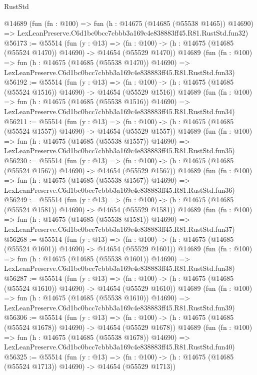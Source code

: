 \begin{lexlean}{RustStd}
\begin{coremodule}
    @14689
    (fun (fn : @100) =>
    fun (h : @14675 (@14685 (@55538 @1465)) @14690) =>
    LexLeanPreserve.C6d1bc0bcc7cbbb3a169c4e838883ff45.R81.RustStd.fun32)
@56173 := @55514
    (fun (y : @13) =>
    (fn : @100) -> (h : @14675 (@14685 (@55524 @1470)) @14690) -> @14654 (@55529 @1470))
    @14689
    (fun (fn : @100) =>
    fun (h : @14675 (@14685 (@55538 @1470)) @14690) =>
    LexLeanPreserve.C6d1bc0bcc7cbbb3a169c4e838883ff45.R81.RustStd.fun33)
@56192 := @55514
    (fun (y : @13) =>
    (fn : @100) -> (h : @14675 (@14685 (@55524 @1516)) @14690) -> @14654 (@55529 @1516))
    @14689
    (fun (fn : @100) =>
    fun (h : @14675 (@14685 (@55538 @1516)) @14690) =>
    LexLeanPreserve.C6d1bc0bcc7cbbb3a169c4e838883ff45.R81.RustStd.fun34)
@56211 := @55514
    (fun (y : @13) =>
    (fn : @100) -> (h : @14675 (@14685 (@55524 @1557)) @14690) -> @14654 (@55529 @1557))
    @14689
    (fun (fn : @100) =>
    fun (h : @14675 (@14685 (@55538 @1557)) @14690) =>
    LexLeanPreserve.C6d1bc0bcc7cbbb3a169c4e838883ff45.R81.RustStd.fun35)
@56230 := @55514
    (fun (y : @13) =>
    (fn : @100) -> (h : @14675 (@14685 (@55524 @1567)) @14690) -> @14654 (@55529 @1567))
    @14689
    (fun (fn : @100) =>
    fun (h : @14675 (@14685 (@55538 @1567)) @14690) =>
    LexLeanPreserve.C6d1bc0bcc7cbbb3a169c4e838883ff45.R81.RustStd.fun36)
@56249 := @55514
    (fun (y : @13) =>
    (fn : @100) -> (h : @14675 (@14685 (@55524 @1581)) @14690) -> @14654 (@55529 @1581))
    @14689
    (fun (fn : @100) =>
    fun (h : @14675 (@14685 (@55538 @1581)) @14690) =>
    LexLeanPreserve.C6d1bc0bcc7cbbb3a169c4e838883ff45.R81.RustStd.fun37)
@56268 := @55514
    (fun (y : @13) =>
    (fn : @100) -> (h : @14675 (@14685 (@55524 @1601)) @14690) -> @14654 (@55529 @1601))
    @14689
    (fun (fn : @100) =>
    fun (h : @14675 (@14685 (@55538 @1601)) @14690) =>
    LexLeanPreserve.C6d1bc0bcc7cbbb3a169c4e838883ff45.R81.RustStd.fun38)
@56287 := @55514
    (fun (y : @13) =>
    (fn : @100) -> (h : @14675 (@14685 (@55524 @1610)) @14690) -> @14654 (@55529 @1610))
    @14689
    (fun (fn : @100) =>
    fun (h : @14675 (@14685 (@55538 @1610)) @14690) =>
    LexLeanPreserve.C6d1bc0bcc7cbbb3a169c4e838883ff45.R81.RustStd.fun39)
@56306 := @55514
    (fun (y : @13) =>
    (fn : @100) -> (h : @14675 (@14685 (@55524 @1678)) @14690) -> @14654 (@55529 @1678))
    @14689
    (fun (fn : @100) =>
    fun (h : @14675 (@14685 (@55538 @1678)) @14690) =>
    LexLeanPreserve.C6d1bc0bcc7cbbb3a169c4e838883ff45.R81.RustStd.fun40)
@56325 := @55514
    (fun (y : @13) =>
    (fn : @100) -> (h : @14675 (@14685 (@55524 @1713)) @14690) -> @14654 (@55529 @1713))

\end{coremodule}
\end{lexlean}
